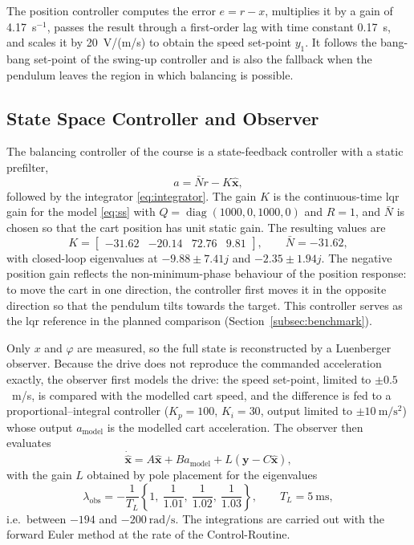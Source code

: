 The position controller computes the error $e = r - x$, multiplies it by a
gain of 4.17~s$^{-1}$, passes the result through a first-order lag with time
constant 0.17~s, and scales it by 20~V/(m/s) to obtain the speed set-point
$y_1$. It follows the bang-bang set-point of the swing-up controller and is
also the fallback when the pendulum leaves the region in which balancing is
possible.

\subsection{State Space Controller and Observer}
\label{subsec:lqr}

The balancing controller of the course is a state-feedback controller with a
static prefilter,
\begin{equation}
  a = \bar{N}r - K\hat{\mathbf{x}},
  \label{eq:lqr}
\end{equation}
followed by the integrator \eqref{eq:integrator}. The gain $K$ is the
continuous-time \ac{lqr} gain for the model \eqref{eq:ss} with
$Q = \operatorname{diag}(1000, 0, 1000, 0)$ and $R = 1$, and $\bar{N}$ is chosen
so that the cart position has unit static gain. The resulting values are
\begin{equation}
  K = \begin{bmatrix} -31.62 & -20.14 & 72.76 & 9.81 \end{bmatrix}, \qquad
  \bar{N} = -31.62,
  \label{eq:Kvalues}
\end{equation}
with closed-loop eigenvalues at $-9.88 \pm 7.41j$ and $-2.35 \pm 1.94j$. The
negative position gain reflects the non-minimum-phase behaviour of the
position response: to move the cart in one direction, the controller first
moves it in the opposite direction so that the pendulum tilts towards the
target. This controller serves as the \ac{lqr} reference in the planned
comparison (Section~\ref{subsec:benchmark}).

Only $x$ and $\varphi$ are measured, so the full state is reconstructed by a
Luenberger observer. Because the drive does not reproduce the commanded
acceleration exactly, the observer first models the drive: the speed
set-point, limited to $\pm 0.5$~m/s, is compared with the modelled cart speed,
and the difference is fed to a proportional--integral controller ($K_p = 100$,
$K_i = 30$, output limited to $\pm 10~\mathrm{m/s^2}$) whose output
$a_{\mathrm{model}}$ is the modelled cart acceleration. The observer then
evaluates
\begin{equation}
  \dot{\hat{\mathbf{x}}} = A\hat{\mathbf{x}} + B a_{\mathrm{model}}
    + L\left(\mathbf{y} - C\hat{\mathbf{x}}\right),
  \label{eq:observer}
\end{equation}
with the gain $L$ obtained by pole placement for the eigenvalues
\begin{equation}
  \lambda_{\mathrm{obs}} = -\frac{1}{T_L}\left\{1,\ \frac{1}{1.01},\ \frac{1}{1.02},\ \frac{1}{1.03}\right\},
  \qquad T_L = 5~\mathrm{ms},
  \label{eq:obspoles}
\end{equation}
i.e.\ between $-194$ and $-200~\mathrm{rad/s}$. The integrations are carried out with the
forward Euler method at the rate of the Control-Routine.

